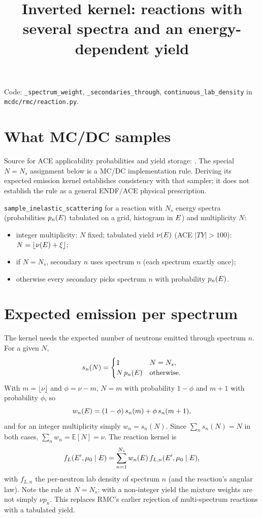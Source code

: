 \documentclass[11pt]{article}
\title{Inverted kernel: reactions with several spectra and an energy-dependent yield}
\date{}
\begin{document}
\maketitle

\noindent Code: \texttt{\_spectrum\_weight}, \texttt{\_secondaries\_through},
\texttt{continuous\_lab\_density} in \texttt{mcdc/rmc/reaction.py}.

\section{What MC/DC samples}

\noindent Source for ACE applicability probabilities and yield storage:
. The special $N=N_s$ assignment below is a
MC/DC implementation rule. Deriving its expected emission kernel establishes
consistency with that sampler; it does not establish the rule as a general
ENDF/ACE physical prescription.

\texttt{sample\_inelastic\_scattering} for a reaction with $N_s$ energy spectra
(probabilities $p_n(E)$ tabulated on a grid, histogram in $E$) and multiplicity
$N$:
\begin{itemize}
  \item integer multiplicity: $N$ fixed; tabulated yield $\nu(E)$ (ACE
  $|TY| > 100$): $N = \lfloor \nu(E) + \xi\rfloor$;
  \item if $N = N_s$, secondary $n$ uses spectrum $n$ (each spectrum exactly once);
  \item otherwise every secondary picks spectrum $n$ with probability $p_n(E)$.
\end{itemize}

\section{Expected emission per spectrum}

The kernel needs the expected number of neutrons emitted through spectrum $n$. For a
given $N$,
\begin{equation}
  s_n(N) = \begin{cases} 1 & N = N_s,\\ N\,p_n(E) & \text{otherwise}.\end{cases}
\end{equation}
With $m = \lfloor\nu\rfloor$ and $\phi = \nu - m$, $N = m$ with probability $1 - \phi$
and $m+1$ with probability $\phi$, so
\begin{equation}
  w_n(E) = (1-\phi)\,s_n(m) + \phi\,s_n(m+1),
\end{equation}
and for an integer multiplicity simply $w_n = s_n(N)$. Since $\sum_n s_n(N) = N$ in
both cases, $\sum_n w_n = \mathbb{E}[N] = \nu$. The reaction kernel is
\begin{equation}
  f_L(E', \mu_0 \mid E) = \sum_{n=1}^{N_s} w_n(E)\,
  f_{L,n}(E', \mu_0 \mid E),
\end{equation}
with $f_{L,n}$ the per-neutron lab density of spectrum $n$ (and the reaction's angular
law). Note the rule at $N = N_s$: with a non-integer yield the mixture weights are not
simply $\nu p_n$. This replaces RMC's earlier rejection of multi-spectrum reactions
with a tabulated yield.
\end{document}
